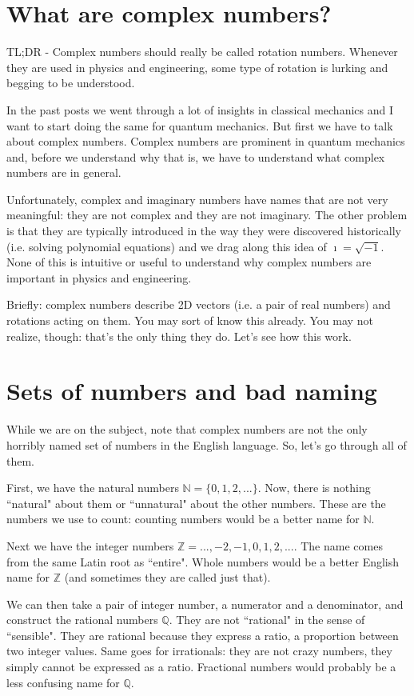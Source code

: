 \documentclass[aps,pra,10pt,floatfix,nofootinbib]{revtex4-1}
\theoremstyle{definition}
\begin{document}
\section{What are complex numbers?}

TL;DR - Complex numbers should really be called rotation numbers. Whenever they are used in physics and engineering, some type of rotation is lurking and begging to be understood.

In the past posts we went through a lot of insights in classical mechanics and I want to start doing the same for quantum mechanics. But first we have to talk about complex numbers. Complex numbers are prominent in quantum mechanics and, before we understand why that is, we have to understand what complex numbers are in general.

Unfortunately, complex and imaginary numbers have names that are not very meaningful: they are not complex and they are not imaginary. The other problem is that they are typically introduced in the way they were discovered historically (i.e. solving polynomial equations) and we drag along this idea of $\imath = \sqrt{-1}$. None of this is intuitive or useful to understand why complex numbers are important in physics and engineering.

Briefly: complex numbers describe 2D vectors (i.e. a pair of real numbers) and rotations acting on them. You may sort of know this already. You may not realize, though: that's the only thing they do. Let's see how this work.

\section{Sets of numbers and bad naming}

While we are on the subject, note that complex numbers are not the only horribly named set of numbers in the English language. So, let's go through all of them.

First, we have the natural numbers $\mathbb{N} = \{0, 1, 2, ...\}$. Now, there is nothing ``natural" about them or ``unnatural" about the other numbers. These are the numbers we use to count: counting numbers would be a better name for $\mathbb{N}$.

Next we have the integer numbers $\mathbb{Z} = {..., -2, -1, 0, 1, 2, ...}$. The name comes from the same Latin root as ``entire". Whole numbers would be a better English name for $\mathbb{Z}$ (and sometimes they are called just that).

We can then take a pair of integer number, a numerator and a denominator, and construct the rational numbers $\mathbb{Q}$. They are not ``rational" in the sense of ``sensible". They are rational because they express a ratio, a proportion between two integer values. Same goes for irrationals: they are not crazy numbers, they simply cannot be expressed as a ratio. Fractional numbers would probably be a less confusing name for $\mathbb{Q}$. 
\end{document}
